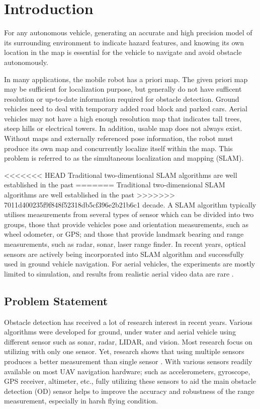 \chapter{Introduction} \label{ch:intro}
For any autonomous vehicle, generating an accurate and high precision model of its surrounding 
environment to indicate hazard features, and knowing its own location in the map is essential for 
the vehicle to navigate and avoid obstacle autonomously. 

In many applications, the mobile robot has a priori map. The given 
priori map may be sufficient for localization purpose, but generally do 
not have sufficent resolution or up-to-date information required for obstacle detection. Ground vehicles 
need to deal with temporary added road block and parked cars. Aerial 
vehicles may not have a high enough resolution map that indicates tall 
trees, steep hills or electrical towers. In addition, usable map does not 
always exist. Without maps and externally referenced pose information, 
the robot must produce its own map and concurrently localize itself 
within the map. This problem is referred to as the simultaneous 
localization and mapping (SLAM). 

<<<<<<< HEAD
Traditional two-dimentional SLAM algorithms are well established in the past
=======
Traditional two-dimensional SLAM algorithms are well established in the past
>>>>>>> 7011d400235f9f848f52318db5cf396e2b21b6c1
decade. A SLAM algorithm typically utilises measurements from several
types of sensor which can be divided into two groups, those that
provide vehicles pose and orientation measurements, such as wheel
odometer, or GPS; and those that provide landmark bearing and range
measurements, such as radar, sonar, laser range finder. In recent
years, optical sensors are actively being incorporated into SLAM
algorithm and successfully used in ground vehicle navigation. For
aerial vehicles, the experiments are mostly limited to simulation, and
results from realistic aerial video data are rare \cite{nemra_robust_2010}
\cite{jianli_unscented_2011} \cite{sunderhauf_using_2007} \cite{artieda_visual_2009}.

\section{Problem Statement}\label{section:ProblemStatement}
Obstacle detection has received a lot of research interest in recent
years. Various algorithms were developed for ground, under water and
aerial vehicle using different sensor such as sonar, radar, LIDAR, and
vision. Most research focus on utilizing with only one sensor. Yet,
research shows that using multiple sensors produces a better
measurement than single sensor \cite{smith_approaches_2006}. With
various sensors readily available on most UAV navigation hardware;
such as accelerometers, gyroscope, GPS receiver, altimeter, etc.,
fully utilizing these sensors to aid the main obstacle detection (OD)
sensor helps to improve the accuracy and robustness of the range
measurement, especially in harsh flying condition.

